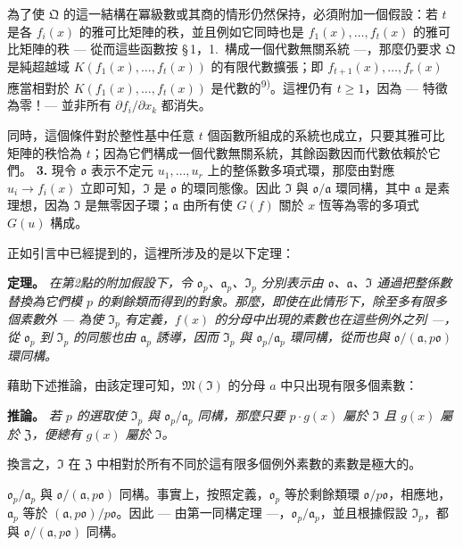 \documentclass[11pt]{article}
\begin{document}
為了使 $\mathfrak{Q}$ 的這一結構在冪級數或其商的情形仍然保持，必須附加一個假設：若 $t$ 是各 $f_i(x)$ 的雅可比矩陣的秩，並且例如它同時也是 $f_1(x),\ldots,f_t(x)$ 的雅可比矩陣的秩 --- 從而這些函數按 \S\,1，1.\ 構成一個代數無關系統 ---，那麼仍要求 $\mathfrak{Q}$ 是純超越域 $K(f_1(x),\ldots,f_t(x))$ 的有限代數擴張；即 $f_{t+1}(x),\ldots,f_r(x)$ 應當相對於 $K(f_1(x),\ldots,f_t(x))$ 是代數的\textsuperscript{9)}。這裡仍有 $t \geq 1$，因為 --- 特徵為零！--- 並非所有 $\partial f_i/\partial x_k$ 都消失。

同時，這個條件對於整性基中任意 $t$ 個函數所組成的系統也成立，只要其雅可比矩陣的秩恰為 $t$；因為它們構成一個代數無關系統，其餘函數因而代數依賴於它們。
\medskip\noindent\textbf{3.}
現令 $\mathfrak{o}$ 表示不定元 $u_1,\ldots,u_r$ 上的整係數多項式環，那麼由對應 $u_i \to f_i(x)$ 立即可知，$\mathfrak{I}$ 是 $\mathfrak{o}$ 的環同態像。因此 $\mathfrak{I}$ 與 $\mathfrak{o}/\mathfrak{a}$ 環同構，其中 $\mathfrak{a}$ 是素理想，因為 $\mathfrak{I}$ 是無零因子環；$\mathfrak{a}$ 由所有使 $G(f)$ 關於 $x$ 恆等為零的多項式 $G(u)$ 構成。

正如引言中已經提到的，這裡所涉及的是以下定理：

\medskip\noindent\textbf{定理。}
\textit{在第2點的附加假設下，令 $\mathfrak{o}_p$、$\mathfrak{a}_p$、$\mathfrak{I}_p$ 分別表示由 $\mathfrak{o}$、$\mathfrak{a}$、$\mathfrak{I}$ 通過把整係數替換為它們模 $p$ 的剩餘類而得到的對象。那麼，即使在此情形下，除至多有限多個素數外 --- 為使 $\mathfrak{I}_p$ 有定義，$f(x)$ 的分母中出現的素數也在這些例外之列 ---，從 $\mathfrak{o}_p$ 到 $\mathfrak{I}_p$ 的同態也由 $\mathfrak{a}_p$ 誘導，因而 $\mathfrak{I}_p$ 與 $\mathfrak{o}_p/\mathfrak{a}_p$ 環同構，從而也與 $\mathfrak{o}/(\mathfrak{a}, p\mathfrak{o})$ 環同構。}

藉助下述推論，由該定理可知，$\mathfrak{M}(\mathfrak{I})$ 的分母 $a$ 中只出現有限多個素數：

\medskip\noindent\textbf{推論。}
\textit{若 $p$ 的選取使 $\mathfrak{I}_p$ 與 $\mathfrak{o}_p/\mathfrak{a}_p$ 同構，那麼只要 $p \cdot g(x)$ 屬於 $\mathfrak{I}$ 且 $g(x)$ 屬於 $\mathfrak{Z}$，便總有 $g(x)$ 屬於 $\mathfrak{I}$。}

換言之，$\mathfrak{I}$ 在 $\mathfrak{Z}$ 中相對於所有不同於這有限多個例外素數的素數是極大的。

$\mathfrak{o}_p/\mathfrak{a}_p$ 與 $\mathfrak{o}/(\mathfrak{a}, p\mathfrak{o})$ 同構。事實上，按照定義，$\mathfrak{o}_p$ 等於剩餘類環 $\mathfrak{o}/p\mathfrak{o}$，相應地，$\mathfrak{a}_p$ 等於 $(\mathfrak{a}, p\mathfrak{o})/p\mathfrak{o}$。因此 --- 由第一同構定理 ---，$\mathfrak{o}_p/\mathfrak{a}_p$，並且根據假設 $\mathfrak{I}_p$，都與 $\mathfrak{o}/(\mathfrak{a}, p\mathfrak{o})$ 同構。
\end{document}
